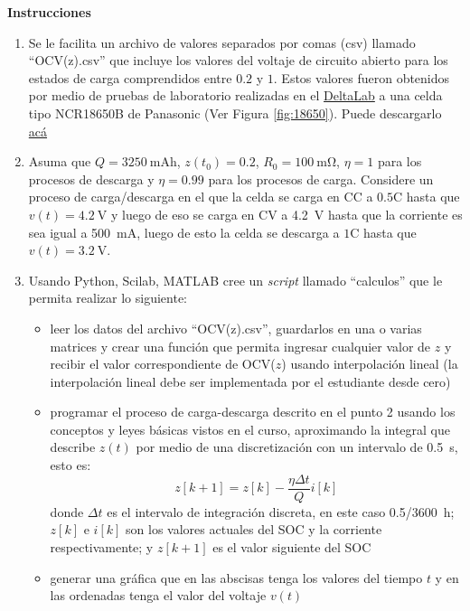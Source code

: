 \documentclass[12pt]{article}
\begin{document}
\textbf{Instrucciones}
\begin{enumerate}
    \item Se le facilita un archivo de valores separados por comas (csv) llamado ``OCV(z).csv'' que incluye los valores del voltaje de circuito abierto para los estados de carga comprendidos entre $0.2$ y $1$. Estos valores fueron obtenidos por medio de pruebas de laboratorio realizadas en el \href{https://www.tec.ac.cr/unidades/laboratorio-delta}{DeltaLab} a una celda tipo NCR18650B de Panasonic (Ver Figura \ref{fig:18650}). Puede descargarlo \href{https://estudianteccr-my.sharepoint.com/:x:/g/personal/prof_juan_rojas_estudiantec_cr/EaWEaD9eY35Clh4iO77cZ5YBe0Tf2joTGQHzCdW8IVIatA?e=91HoDB}{acá}
    \item Asuma que $Q = \SI{3250}{\milli\ampere\hour}$, $z(t_0) = 0.2$, $R_0 = \SI{100}{\milli\ohm}$, $\eta = 1$ para los procesos de descarga y $\eta = 0.99$ para los procesos de carga. Considere un proceso de carga/descarga en el que la celda se carga en CC a $0.5$C hasta que $v(t)=\SI{4.2}{\volt}$ y luego de eso se carga en CV a \SI{4.2}{\volt} hasta que la corriente es sea igual a \SI{500}{\milli\ampere}, luego de esto la celda se descarga a $1$C hasta que $v(t)=\SI{3.2}{\volt}$.
    \item Usando Python, Scilab, MATLAB cree un \emph{script} llamado ``calculos'' que le permita realizar lo siguiente:
    \begin{itemize}
        \item leer los datos del archivo ``OCV(z).csv'', guardarlos en una o varias matrices y crear una función que permita ingresar cualquier valor de $z$ y recibir el valor correspondiente de OCV($z$) usando interpolación lineal (la interpolación lineal debe ser implementada por el estudiante desde cero) 
        \item programar el proceso de carga-descarga descrito en el punto 2 usando los conceptos y leyes básicas vistos en el curso, aproximando la integral que describe $z(t)$ por medio de una discretización con un intervalo de \SI{0.5}{\second}, esto es: 
        \begin{equation*}
            z[k+1] = z[k] - \dfrac{\eta \Delta t}{Q}i[k]
        \end{equation*}
        donde $\Delta t$ es el intervalo de integración discreta, en este caso \SI{0.5/3600}{\hour}; $z[k]$ e $i[k]$ son los valores actuales del SOC y la corriente respectivamente; y $z[k+1]$ es el valor siguiente del SOC
        \item generar una gráfica que en las abscisas tenga los valores del tiempo $t$ y en las ordenadas tenga el valor del voltaje $v(t)$

\end{itemize}
\end{enumerate}
\end{document}
